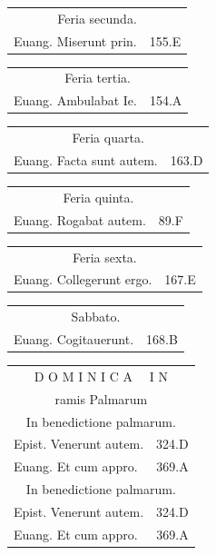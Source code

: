 \documentclass[a5paper,10pt]{book}
\begin{document}
\begin{multicols*}{2}
\begin{tabular}{l r}
\multicolumn{2}{c}{\color{red} Feria secunda.}\\
Euang. Miserunt prin. & 155.E\\
\end{tabular}
\begin{tabular}{l r}
\multicolumn{2}{c}{\color{red} Feria tertia.}\\
Euang. Ambulabat Ie. & 154.A\\
\end{tabular}
\begin{tabular}{l r}
\multicolumn{2}{c}{\color{red} Feria quarta.}\\
Euang. Facta sunt autem. & 163.D\\
\end{tabular}
\begin{tabular}{l r}
\multicolumn{2}{c}{\color{red} Feria quinta.}\\
Euang. Rogabat autem. & 89.F\\
\end{tabular}
\begin{tabular}{l r}
\multicolumn{2}{c}{\color{red} Feria sexta.}\\
Euang. Collegerunt ergo. & 167.E\\
\end{tabular}
\begin{tabular}{l r}
\multicolumn{2}{c}{\color{red} Sabbato.}\\
Euang. Cogitauerunt. & 168.B\\
\end{tabular}
\vspace{+.25em}
\begin{tabular}{l r}
\multicolumn{2}{c}{\color{red} \large D O M I N I C A \ \ I N}\\
\multicolumn{2}{c}{\color{red} ramis Palmarum}\\
\multicolumn{2}{c}{\color{red} In benedictione palmarum.}\\
Epist. Venerunt autem. & 324.D\\
Euang. Et cum appro. & 369.A\\
\multicolumn{2}{c}{\color{red} In benedictione palmarum.}\\
Epist. Venerunt autem. & 324.D\\
Euang. Et cum appro. & 369.A\\
\end{tabular}
\end{multicols*}
\end{document}
